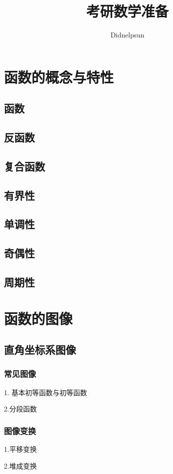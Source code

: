 \documentclass[UTF8]{ctexart}
\author{Didnelpsun}
\title{考研数学准备}
\begin{document}
\maketitle
\thispagestyle{empty}
\tableofcontents
\thispagestyle{empty}
\newpage
\pagestyle{plain}
\setcounter{page}{1}
\section{函数的概念与特性}
\subsection{函数}
\subsection{反函数}
\subsection{复合函数}
\subsection{有界性}
\subsection{单调性}
\subsection{奇偶性}
\subsection{周期性}
\section{函数的图像}
\subsection{直角坐标系图像}
\subsubsection{常见图像}
1. 基本初等函数与初等函数

2.分段函数
\subsubsection{图像变换}
1.平移变换

2.堆成变换
\end{document}

